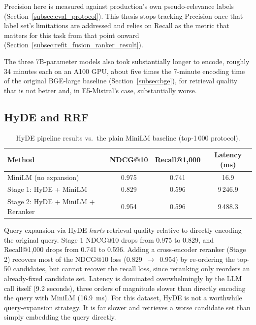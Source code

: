 \documentclass[a4paper,oneside,bibliography=totoc]{scrbook}
\begin{document}
Precision here is measured against production's own pseudo-relevance labels (Section~\ref{subsec:eval_protocol}). This thesis stops tracking Precision once that label set's limitations are addressed and relies on Recall as the metric that matters for this task from that point onward (Section~\ref{subsec:refit_fusion_ranker_result}).

The three 7B-parameter models also took substantially longer to encode, roughly 34 minutes each on an A100 GPU, about five times the 7-minute encoding time of the original BGE-large baseline (Section~\ref{subsec:bge}), for retrieval quality that is not better and, in E5-Mistral's case, substantially worse.

\subsection{HyDE and RRF}
\label{sec:hyde_result}

\begin{table}[ht]
\centering
\caption{HyDE pipeline results vs.\ the plain MiniLM baseline (top-1\,000 protocol).}
\label{tab:hyde}
\small
\setlength{\tabcolsep}{4pt}
\begin{tabular}{lccc}
\toprule
\textbf{Method} & \textbf{NDCG@10} & \textbf{Recall@1{,}000} & \textbf{Latency (ms)} \\
\midrule
MiniLM (no expansion)        & 0.975 & 0.741 & 16.9 \\
Stage 1: HyDE + MiniLM       & 0.829 & 0.596 & 9\,246.9 \\
Stage 2: HyDE + MiniLM + Reranker & 0.954 & 0.596 & 9\,488.3 \\
\bottomrule
\end{tabular}
\end{table}

Query expansion via HyDE \emph{hurts} retrieval quality relative to directly encoding the original query. Stage 1 NDCG@10 drops from 0.975 to 0.829, and Recall@1{,}000 drops from 0.741 to 0.596. Adding a cross-encoder reranker (Stage 2) recovers most of the NDCG@10 loss (0.829~$\to$~0.954) by re-ordering the top-50 candidates, but cannot recover the recall loss, since reranking only reorders an already-fixed candidate set. Latency is dominated overwhelmingly by the LLM call itself (9.2 seconds), three orders of magnitude slower than directly encoding the query with MiniLM (16.9~ms). For this dataset, HyDE is not a worthwhile query-expansion strategy. It is far slower and retrieves a worse candidate set than simply embedding the query directly.
\end{document}
